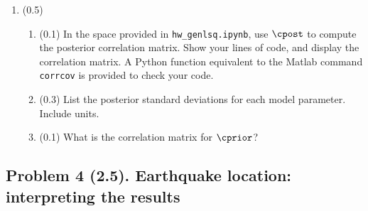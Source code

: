 \documentclass[11pt,titlepage,fleqn]{article}
\newcommand{\tfile}{{\tt hw\_genlsq.ipynb}}
\begin{document}
\begin{enumerate}

\item (0.5) 
\begin{enumerate}
\item (0.1) In the space provided in \tfile, use $\cpost$ to compute the posterior correlation matrix. Show your lines of code, and display the correlation matrix. A Python function equivalent to the Matlab command \verb+corrcov+ is provided to check your code.

\item (0.3) List the posterior standard deviations for each model parameter. Include units.

\item (0.1) What is the correlation matrix for $\cprior$?
\end{enumerate}

\end{enumerate}


\subsection*{Problem 4 (2.5). Earthquake location: interpreting the results}
\end{document}
